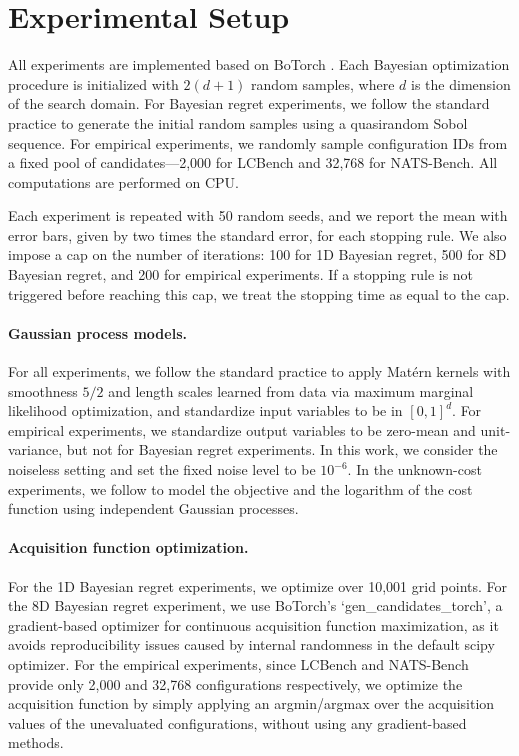\section{Experimental Setup}
\label{apdx:experiment_setup}
All experiments are implemented based on BoTorch \citep{balandat2020botorch}. Each
Bayesian optimization procedure is initialized with $2(d + 1)$ random samples, where $d$ is
the dimension of the search domain. For Bayesian regret experiments, we follow the standard practice to generate the initial random samples using a quasirandom Sobol sequence. For empirical experiments, we randomly sample configuration IDs from a fixed pool of candidates—2,000 for LCBench and 32,768 for NATS-Bench. All computations are performed on CPU.

Each experiment is repeated with 50 random seeds, and we report the mean with error bars, given by two times the standard error, for each stopping rule. We also impose a cap on the number of iterations: 100 for 1D Bayesian regret, 500 for 8D Bayesian regret, and 200 for empirical experiments. If a stopping rule is not triggered before reaching this cap, we treat the stopping time as equal to the cap.

\paragraph*{Gaussian process models.}
For all experiments, we follow the standard practice to apply Matérn kernels with smoothness $5/2$ and length scales learned from data via maximum marginal likelihood optimization, and standardize input variables to be in $[0,1]^d$. For empirical experiments, we standardize output variables to be zero-mean and unit-variance, but not for Bayesian regret experiments.
In this work, we consider the noiseless setting and set the fixed noise level to be $10^{-6}$.
In the unknown-cost experiments, we follow \citet{astudillo2021multi} to model the objective and the logarithm of the cost function using independent Gaussian processes.

\paragraph*{Acquisition function optimization.} For the 1D Bayesian regret experiments, we optimize over 10,001 grid points. For the 8D Bayesian regret experiment, we use BoTorch’s `gen\_candidates\_torch', a gradient-based optimizer for continuous acquisition function maximization, as it avoids reproducibility issues caused by internal randomness in the default scipy optimizer. For the empirical experiments, since LCBench and NATS-Bench provide only 2,000 and 32,768 configurations respectively, we optimize the acquisition function by simply applying an argmin/argmax over the acquisition values of the unevaluated configurations, without using any gradient-based methods.

